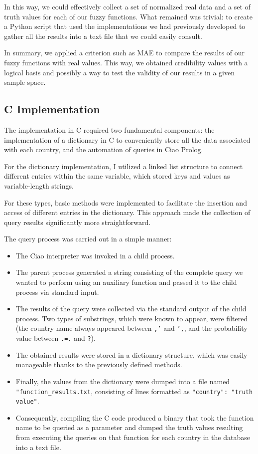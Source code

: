 \documentclass[fleqn,11pt]{article}
\begin{document}
In this way, we could effectively collect a set of normalized real data and a set of truth values for each of our fuzzy functions. What remained was trivial: to create a Python script that used the implementations we had previously developed to gather all the results into a text file that we could easily consult.

In summary, we applied a criterion such as MAE to compare the results of our fuzzy functions with real values. This way, we obtained credibility values with a logical basis and possibly a way to test the validity of our results in a given sample space.


\subsection{C Implementation}

The implementation in C required two fundamental components: the implementation of a dictionary in C to conveniently store all the data associated with each country, and the automation of queries in Ciao Prolog.

For the dictionary implementation, I utilized a linked list structure to connect different entries within the same variable, which stored keys and values as variable-length strings.

For these types, basic methods were implemented to facilitate the insertion and access of different entries in the dictionary. This approach made the collection of query results significantly more straightforward.

The query process was carried out in a simple manner:
\begin{itemize}
    \item The Ciao interpreter was invoked in a child process.
    \item The parent process generated a string consisting of the complete query we wanted to perform using an auxiliary function and passed it to the child process via standard input.
    \item The results of the query were collected via the standard output of the child process. Two types of substrings, which were known to appear, were filtered (the country name always appeared between \texttt{,'} and \texttt{',}, and the probability value between \texttt{.=.} and \texttt{?}).
    \item The obtained results were stored in a dictionary structure, which was easily manageable thanks to the previously defined methods.
    \item Finally, the values from the dictionary were dumped into a file named \texttt{"function\_results.txt}, consisting of lines formatted as \texttt{"country": "truth value"}.
    \item Consequently, compiling the C code produced a binary that took the function name to be queried as a parameter and dumped the truth values resulting from executing the queries on that function for each country in the database into a text file.
\end{itemize}
\end{document}
